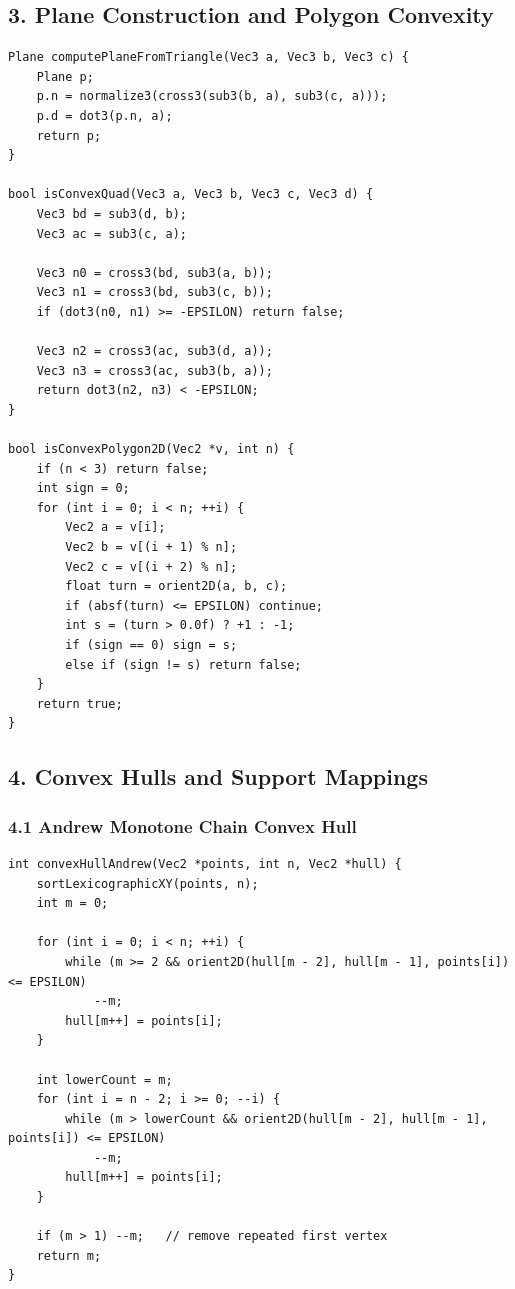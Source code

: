 \documentclass[10pt,letterpaper]{article}
\begin{document}
\subsection*{3. Plane Construction and Polygon Convexity}

\begin{verbatim}
Plane computePlaneFromTriangle(Vec3 a, Vec3 b, Vec3 c) {
    Plane p;
    p.n = normalize3(cross3(sub3(b, a), sub3(c, a)));
    p.d = dot3(p.n, a);
    return p;
}

bool isConvexQuad(Vec3 a, Vec3 b, Vec3 c, Vec3 d) {
    Vec3 bd = sub3(d, b);
    Vec3 ac = sub3(c, a);

    Vec3 n0 = cross3(bd, sub3(a, b));
    Vec3 n1 = cross3(bd, sub3(c, b));
    if (dot3(n0, n1) >= -EPSILON) return false;

    Vec3 n2 = cross3(ac, sub3(d, a));
    Vec3 n3 = cross3(ac, sub3(b, a));
    return dot3(n2, n3) < -EPSILON;
}

bool isConvexPolygon2D(Vec2 *v, int n) {
    if (n < 3) return false;
    int sign = 0;
    for (int i = 0; i < n; ++i) {
        Vec2 a = v[i];
        Vec2 b = v[(i + 1) % n];
        Vec2 c = v[(i + 2) % n];
        float turn = orient2D(a, b, c);
        if (absf(turn) <= EPSILON) continue;
        int s = (turn > 0.0f) ? +1 : -1;
        if (sign == 0) sign = s;
        else if (sign != s) return false;
    }
    return true;
}
\end{verbatim}


\subsection*{4. Convex Hulls and Support Mappings}


\subsubsection*{4.1 Andrew Monotone Chain Convex Hull}

\begin{verbatim}
int convexHullAndrew(Vec2 *points, int n, Vec2 *hull) {
    sortLexicographicXY(points, n);
    int m = 0;

    for (int i = 0; i < n; ++i) {
        while (m >= 2 && orient2D(hull[m - 2], hull[m - 1], points[i]) <= EPSILON)
            --m;
        hull[m++] = points[i];
    }

    int lowerCount = m;
    for (int i = n - 2; i >= 0; --i) {
        while (m > lowerCount && orient2D(hull[m - 2], hull[m - 1], points[i]) <= EPSILON)
            --m;
        hull[m++] = points[i];
    }

    if (m > 1) --m;   // remove repeated first vertex
    return m;
}
\end{verbatim}
\end{document}
